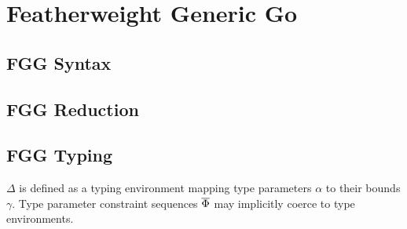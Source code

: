 \section{Featherweight Generic Go}

\subsection{FGG Syntax}



\subsection{FGG Reduction}



\subsection{FGG Typing}

$\Delta$ is defined as a typing environment mapping type parameters $\alpha$
to their bounds $\gamma$. Type parameter constraint sequences $\overline{\Phi}$ may
implicitly coerce to type environments.



